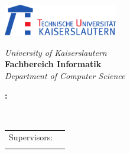 
\begin{titlepage}

\parbox[t]{12cm}{
	\parbox[c]{5cm}{\includegraphics[width=5cm]{pics/Logo-TU-KL-text}}
	
	\vspace{1ex}
	\hspace{1.39cm}
	\parbox[t]{8.5cm}{\textsf{\textit{University of Kaiserslautern}\\[0.4cm]
		\textbf{Fachbereich Informatik}\\
		\textit{Department of Computer Science}}}
}

\begin{center}
	\vspace{3cm}
	
	\large
	\textbf{\ThesisType}
	
	
	\vspace{3em}
	
	\LARGE
	\textbf{\TheTitle:\\
	\Large \TheSubTitle}
	
	\large
	
	\vspace{5em}
	
	\textbf{\TheAuthor}\\[1ex]
	{\small{\Email}}
	
	\vfill
	\submissiondate
\end{center}

\vfill

\begin{center}
	\renewcommand*{\and}{ \\ &}
	\begin{tabular}{ll}
		Supervisors: & \supervisorA \\
		             & \supervisorB
		
	\end{tabular}
\end{center}

\end{titlepage}
